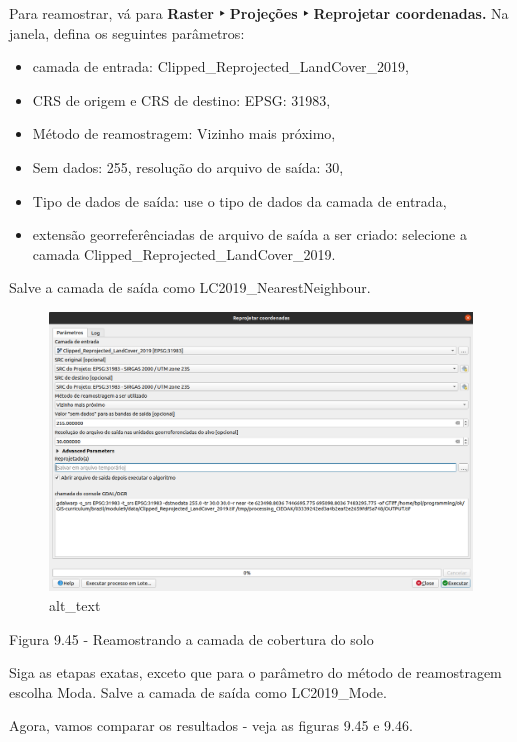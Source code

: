 \documentclass[
]{book}
\providecommand{\tightlist}{%
  \setlength{\itemsep}{0pt}\setlength{\parskip}{0pt}}
\begin{document}
Para reamostrar, vá para \textbf{Raster ‣ Projeções ‣ Reprojetar coordenadas.} Na janela, defina os seguintes parâmetros:

\begin{itemize}
\tightlist
\item
  camada de entrada: Clipped\_Reprojected\_LandCover\_2019,
\item
  CRS de origem e CRS de destino: EPSG: 31983,
\item
  Método de reamostragem: Vizinho mais próximo,
\item
  Sem dados: 255, resolução do arquivo de saída: 30,
\item
  Tipo de dados de saída: use o tipo de dados da camada de entrada,
\item
  extensão georreferênciadas de arquivo de saída a ser criado: selecione a camada Clipped\_Reprojected\_LandCover\_2019.
\end{itemize}

Salve a camada de saída como LC2019\_NearestNeighbour.

\begin{figure}
\centering
\includegraphics{media/modulo9/fig945.png}
\caption{alt\_text}
\end{figure}

Figura 9.45 - Reamostrando a camada de cobertura do solo

Siga as etapas exatas, exceto que para o parâmetro do método de reamostragem escolha Moda. Salve a camada de saída como LC2019\_Mode.

Agora, vamos comparar os resultados - veja as figuras 9.45 e 9.46.
\end{document}
